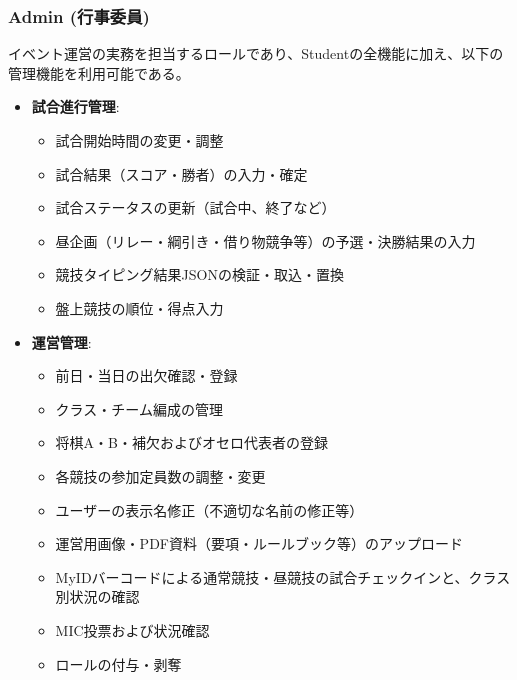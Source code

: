 \documentclass[paper=a4, fontsize=11pt]{jlreq}
\begin{document}
\subsubsection{Admin (行事委員)}
イベント運営の実務を担当するロールであり、Studentの全機能に加え、以下の管理機能を利用可能である。
\begin{itemize}
    \item \textbf{試合進行管理}:
    \begin{itemize}
        \item 試合開始時間の変更・調整
        \item 試合結果（スコア・勝者）の入力・確定
        \item 試合ステータスの更新（試合中、終了など）
        \item 昼企画（リレー・綱引き・借り物競争等）の予選・決勝結果の入力
        \item 競技タイピング結果JSONの検証・取込・置換
        \item 盤上競技の順位・得点入力
    \end{itemize}
    \item \textbf{運営管理}:
    \begin{itemize}
        \item 前日・当日の出欠確認・登録
        \item クラス・チーム編成の管理
        \item 将棋A・B・補欠およびオセロ代表者の登録
        \item 各競技の参加定員数の調整・変更
        \item ユーザーの表示名修正（不適切な名前の修正等）
        \item 運営用画像・PDF資料（要項・ルールブック等）のアップロード
        \item MyIDバーコードによる通常競技・昼競技の試合チェックインと、クラス別状況の確認
        \item MIC投票および状況確認
        \item ロールの付与・剥奪
    \end{itemize}
\end{itemize}
\end{document}
